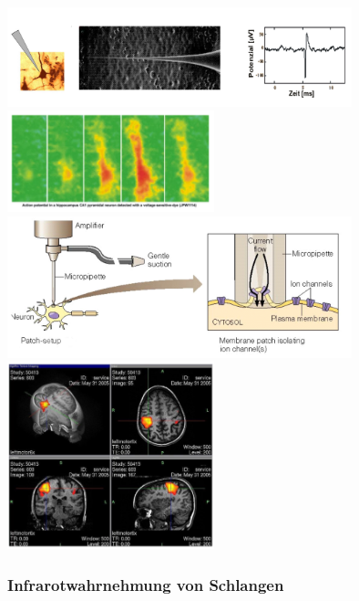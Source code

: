 \begin{center}
    \includegraphics[width=10cm]{lec8/figures/elektrode.png}
    \hfill
    \includegraphics[width=6cm]{lec8/figures/dye.png}
    \\
    \includegraphics[width=10cm]{lec8/figures/clamp.png}
    \hfill
    \includegraphics[width=6cm]{lec8/figures/MRI.png}
\end{center}

\subsubsection{Infrarotwahrnehmung von Schlangen}


